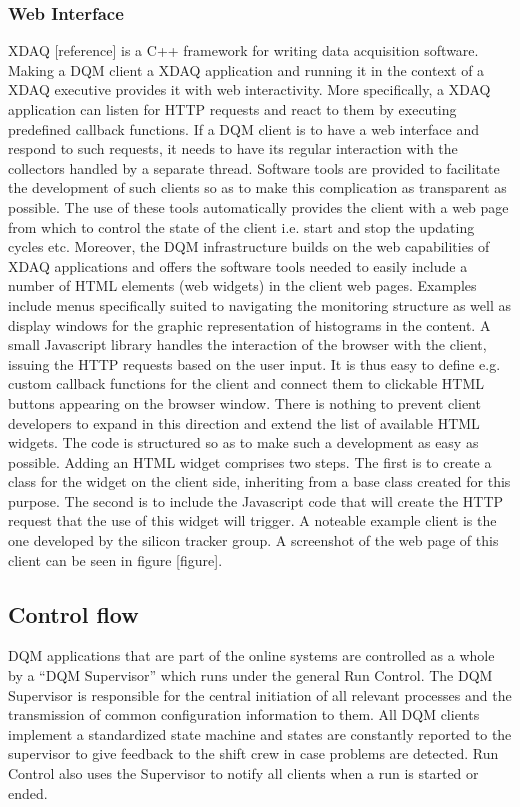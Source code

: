 \documentclass[a4paper]{cmspaper}
\begin{document}
\subsubsection{Web Interface}
XDAQ [reference] is a C++ framework for writing data acquisition software. Making a DQM client a XDAQ application and running it in the context of a XDAQ executive provides 
it with web interactivity. More specifically, a XDAQ application can listen for HTTP requests and react to them by executing predefined callback functions. If a DQM client 
is to have a web interface and respond to such requests, it needs to have its regular interaction with the collectors handled by a separate thread. Software tools are 
provided to facilitate the development of such clients so as to make this complication as transparent as possible. The use of these tools automatically provides the client 
with a web page from which to control the state of the client i.e. start and stop the updating cycles etc.
%
Moreover, the DQM infrastructure builds on the web capabilities of XDAQ applications and offers the software tools needed to easily include a number of HTML elements (web 
widgets) in the client web pages. Examples include menus specifically suited to navigating the monitoring structure as well as display windows for the graphic 
representation of histograms in the content. A small Javascript library handles the interaction of the browser with the client, issuing the HTTP requests based on the user 
input. It is thus easy to define e.g. custom callback functions for the client and connect them to clickable HTML buttons appearing on the browser window. 
%
There is nothing to prevent client developers to expand in this direction and extend the list of available HTML widgets. The code is structured so as to make such a 
development as easy as possible. Adding an HTML widget comprises two steps. The first is to create a class for the widget on the client side, inheriting from a base class 
created for this purpose. The second is to include the Javascript code that will create the HTTP request that the use of this widget will trigger. A noteable example client 
is the one developed by the silicon tracker group. A screenshot of the web page of this client can be seen in figure [figure].

\subsection{Control flow}

DQM applications that are part of the online systems are controlled as a
whole by a ``DQM Supervisor'' which runs under the general Run Control.
The DQM Supervisor is responsible for the central initiation of all relevant processes and the
transmission of common configuration information to them. All DQM clients implement a standardized
state machine and states are constantly reported to the supervisor
to give feedback to the shift crew in case problems are detected.
Run Control also uses the Supervisor to notify all clients when a run is started or
ended.
\end{document}
